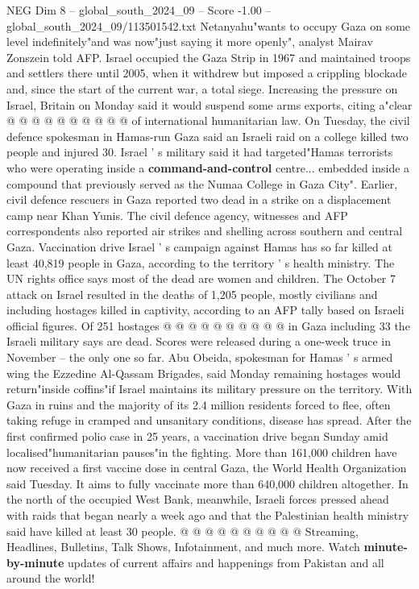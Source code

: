\begin{textsample}{NEG Dim 8 – global\_south\_2024\_09 – Score -1.00 – global\_south\_2024\_09/113501542.txt}
Netanyahu"wants to occupy Gaza on some level indefinitely"and was now"just saying it more openly", analyst Mairav Zonszein told AFP.
Israel occupied the Gaza Strip in 1967 and maintained troops and settlers there until 2005, when it withdrew but imposed a crippling blockade and, since the start of the current war, a total siege.
Increasing the pressure on Israel, Britain on Monday said it would suspend some arms exports, citing a"clear @ @ @ @ @ @ @ @ @ @ of international humanitarian law.
On Tuesday, the civil defence spokesman in Hamas-run Gaza said an Israeli raid on a college killed two people and injured 30.
Israel ' s military said it had targeted"Hamas terrorists who were operating inside a \textbf{command-and-control} centre... embedded inside a compound that previously served as the Numaa College in Gaza City".
Earlier, civil defence rescuers in Gaza reported two dead in a strike on a displacement camp near Khan Yunis.
The civil defence agency, witnesses and AFP correspondents also reported air strikes and shelling across southern and central Gaza.
Vaccination drive Israel ' s campaign against Hamas has so far killed at least 40,819 people in Gaza, according to the territory ' s health ministry.
The UN rights office says most of the dead are women and children.
The October 7 attack on Israel resulted in the deaths of 1,205 people, mostly civilians and including hostages killed in captivity, according to an AFP tally based on Israeli official figures.
Of 251 hostages @ @ @ @ @ @ @ @ @ @ in Gaza including 33 the Israeli military says are dead.
Scores were released during a one-week truce in November -- the only one so far.
Abu Obeida, spokesman for Hamas ' s armed wing the Ezzedine Al-Qassam Brigades, said Monday remaining hostages would return"inside coffins"if Israel maintains its military pressure on the territory.
With Gaza in ruins and the majority of its 2.4 million residents forced to flee, often taking refuge in cramped and unsanitary conditions, disease has spread.
After the first confirmed polio case in 25 years, a vaccination drive began Sunday amid localised"humanitarian pauses"in the fighting.
More than 161,000 children have now received a first vaccine dose in central Gaza, the World Health Organization said Tuesday.
It aims to fully vaccinate more than 640,000 children altogether.
In the north of the occupied West Bank, meanwhile, Israeli forces pressed ahead with raids that began nearly a week ago and that the Palestinian health ministry said have killed at least 30 people. @ @ @ @ @ @ @ @ @ @ Streaming, Headlines, Bulletins, Talk Shows, Infotainment, and much more.
Watch \textbf{minute-by-minute} updates of current affairs and happenings from Pakistan and all around the world!

\end{textsample}
